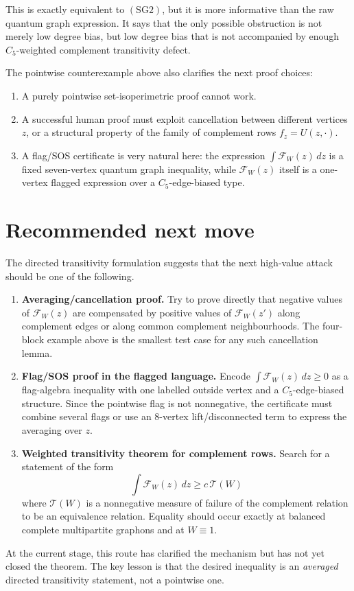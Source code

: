 \documentclass[11pt]{article}
\newcommand{\dd}{\,d}
\begin{document}
This is exactly equivalent to \((\mathrm{SG2})\), but it is more informative than
the raw quantum graph expression.  It says that the only possible obstruction is
not merely low degree bias, but low degree bias that is not accompanied by enough
\(C_5\)-weighted complement transitivity defect.

The pointwise counterexample above also clarifies the next proof choices:
\begin{enumerate}[label=(\roman*)]
\item A purely pointwise set-isoperimetric proof cannot work.
\item A successful human proof must exploit cancellation between different
vertices \(z\), or a structural property of the family of complement rows
\(f_z=U(z,\cdot)\).
\item A flag/SOS certificate is very natural here: the expression
\(\int\mathcal F_W(z)\dd z\) is a fixed seven-vertex quantum graph inequality,
while \(\mathcal F_W(z)\) itself is a one-vertex flagged expression over a
\(C_5\)-edge-biased type.
\end{enumerate}

\section{Recommended next move}

The directed transitivity formulation suggests that the next high-value attack
should be one of the following.

\begin{enumerate}[label=\textbf{Route \arabic*.},leftmargin=*]
\item \textbf{Averaging/cancellation proof.}  Try to prove directly that negative
values of \(\mathcal F_W(z)\) are compensated by positive values of
\(\mathcal F_W(z')\) along complement edges or along common complement
neighbourhoods.  The four-block example above is the smallest test case for any
such cancellation lemma.

\item \textbf{Flag/SOS proof in the flagged language.}  Encode
\(\int\mathcal F_W(z)\dd z\ge0\) as a flag-algebra inequality with one labelled
outside vertex and a \(C_5\)-edge-biased structure.  Since the pointwise flag is
not nonnegative, the certificate must combine several flags or use an
8-vertex lift/disconnected term to express the averaging over \(z\).

\item \textbf{Weighted transitivity theorem for complement rows.}  Search for a
statement of the form
\[
\int \mathcal F_W(z)\dd z
\ge c\,\mathcal T(W)
\]
where \(\mathcal T(W)\) is a nonnegative measure of failure of the complement
relation to be an equivalence relation.  Equality should occur exactly at
balanced complete multipartite graphons and at \(W\equiv1\).
\end{enumerate}

At the current stage, this route has clarified the mechanism but has not yet
closed the theorem.  The key lesson is that the desired inequality is an
\emph{averaged} directed transitivity statement, not a pointwise one.
\end{document}
